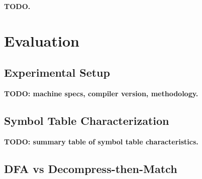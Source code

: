 \documentclass[sigconf,nonacm]{acmart}
\begin{document}
\textbf{TODO.}


\section{Evaluation}
\label{sec:eval}


\subsection{Experimental Setup}
\label{sec:eval-setup}

\textbf{TODO: machine specs, compiler version, methodology.}


\subsection{Symbol Table Characterization}
\label{sec:eval-symtab}

%
%

\textbf{TODO: summary table of symbol table characteristics.}


\subsection{DFA vs Decompress-then-Match}
\label{sec:eval-throughput}

%
\end{document}
